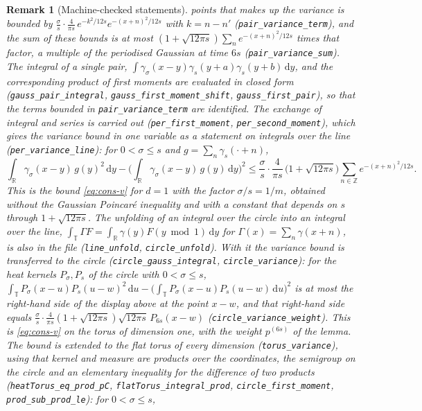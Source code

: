 \documentclass[11pt,a4paper]{article}
\theoremstyle{stmt}
\theoremstyle{defn}
\theoremstyle{rmk}
\newtheorem{remark}[theorem]{Remark}
\numberwithin{equation}{section}
\newcommand{\R}{\mathbb{R}}
\newcommand{\dd}{\mathrm{d}}
\begin{document}
{\begin{remark}[Machine-checked statements]
points that makes up the variance is bounded by $\frac\sigma s\cdot\frac4{\pi s}\,e^{-k^2/12s}e^{-(x+n)^2/12s}$ with $k=n-n'$ (\texttt{pair\_variance\_term}), and the sum of these bounds is at most $(1+\sqrt{12\pi s})\sum_ne^{-(x+n)^2/12s}$ times that factor, a multiple of the periodised Gaussian at time $6s$ (\texttt{pair\_variance\_sum}). The integral of a single pair, $\int\gamma_\sigma(x-y)\gamma_s(y+a)\gamma_s(y+b)\,\dd y$, and the corresponding product of first moments are evaluated in closed form (\texttt{gauss\_pair\_integral}, \texttt{gauss\_first\_moment\_shift}, \texttt{gauss\_first\_pair}), so that the terms bounded in \texttt{pair\_variance\_term} are identified. The exchange of integral and series is carried out (\texttt{per\_first\_moment}, \texttt{per\_second\_moment}), which gives the variance bound in one variable as a statement on integrals over the line (\texttt{per\_variance\_line}): for $0<\sigma\le s$ and $g=\sum_n\gamma_s(\cdot+n)$,
\[
\int_{\R}\gamma_\sigma(x-y)\,g(y)^2\,\dd y-\Big(\int_{\R}\gamma_\sigma(x-y)\,g(y)\,\dd y\Big)^2\le\frac\sigma s\cdot\frac4{\pi s}\,\big(1+\sqrt{12\pi s}\big)\sum_{n\in\mathbb Z}e^{-(x+n)^2/12s}.
\]
This is the bound \eqref{eq:cons-v} for $d=1$ with the factor $\sigma/s=1/m$, obtained without the Gaussian Poincar\'e inequality and with a constant that depends on $s$ through $1+\sqrt{12\pi s}$. The unfolding of an integral over the circle into an integral over the line, $\int_{\mathbb T}\Gamma F=\int_{\R}\gamma(y)F(y\bmod1)\,\dd y$ for $\Gamma(x)=\sum_n\gamma(x+n)$, is also in the file (\texttt{line\_unfold}, \texttt{circle\_unfold}). With it the variance bound is transferred to the circle (\texttt{circle\_gauss\_integral}, \texttt{circle\_variance}): for the heat kernels $P_\sigma,P_s$ of the circle with $0<\sigma\le s$, $\int_{\mathbb T}P_\sigma(x-u)P_s(u-w)^2\,\dd u-\big(\int_{\mathbb T}P_\sigma(x-u)P_s(u-w)\,\dd u\big)^2$ is at most the right-hand side of the display above at the point $x-w$, and that right-hand side equals $\frac\sigma s\cdot\frac4{\pi s}(1+\sqrt{12\pi s})\sqrt{12\pi s}\,P_{6s}(x-w)$ (\texttt{circle\_variance\_weight}). This is \eqref{eq:cons-v} on the torus of dimension one, with the weight $p^{(6s)}$ of the lemma. The bound is extended to the flat torus of every dimension (\texttt{torus\_variance}), using that kernel and measure are products over the coordinates, the semigroup on the circle and an elementary inequality for the difference of two products (\texttt{heatTorus\_eq\_prod\_pC}, \texttt{flatTorus\_integral\_prod}, \texttt{circle\_first\_moment}, \texttt{prod\_sub\_prod\_le}): for $0<\sigma\le s$,

\end{remark}}
\end{document}
